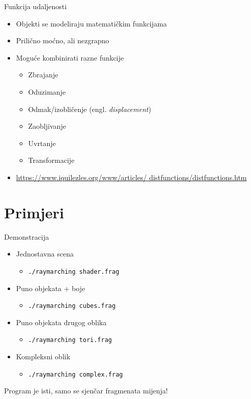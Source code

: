 \documentclass[12pt]{beamer}
\begin{document}
  \begin{frame}{Funkcija udaljenosti}
    \begin{itemize}
    \item Objekti se modeliraju matematičkim funkcijama
    \item Prilično moćno, ali nezgrapno
    \item Moguće kombinirati razne funkcije
          \begin{itemize}
          \item Zbrajanje
          \item Oduzimanje
          \item Odmak/izobličenje (engl. {\sl displacement}\/)
          \item Zaobljivanje
          \item Uvrtanje
          \item Transformacije
          \end{itemize}
        \item \href{https://www.iquilezles.org/www/articles/distfunctions/distfunctions.htm}{https://www.iquilezles.org/www/articles/
                 distfunctions/distfunctions.htm}
    \end{itemize}
  \end{frame}

  \section{Primjeri}

  \begin{frame}{Demonstracija}
    \begin{itemize}
    \item Jednostavna scena
      \begin{itemize}
        \item \texttt{./raymarching shader.frag}
      \end{itemize}
    \item Puno objekata + boje
      \begin{itemize}
        \item \texttt{./raymarching cubes.frag}
      \end{itemize}
    \item Puno objekata drugog oblika
      \begin{itemize}
        \item \texttt{./raymarching tori.frag}
      \end{itemize}
    \item Kompleksni oblik
      \begin{itemize}
        \item \texttt{./raymarching complex.frag}
      \end{itemize}
    \end{itemize}

    Program je isti, samo se sjenčar fragmenata mijenja!
  \end{frame}
\end{document}
